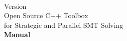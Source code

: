 \begin{titlepage}
	\begin{center}
		\Huge{\textbf{\TITLE}}\\
		\Huge{Version \VERSION}\vspace{1cm}\\
		\Large Open Source C++ Toolbox\\ for Strategic and Parallel SMT Solving\vspace{1cm}\\
		\Huge{\textbf{Manual}}
		\vspace{2cm}\\
		\begin{center}
		
		\end{center}
	\end{center}
\end{titlepage}
